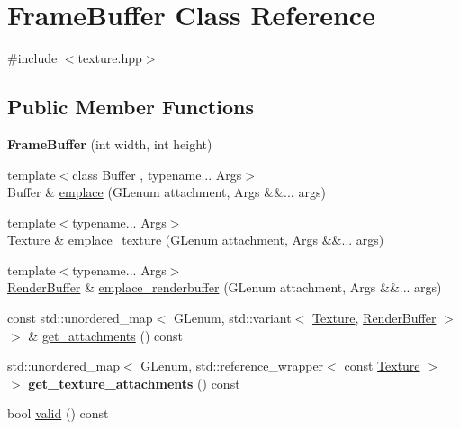 \hypertarget{class_frame_buffer}{}\section{Frame\+Buffer Class Reference}
\label{class_frame_buffer}


{\ttfamily \#include $<$texture.\+hpp$>$}

\subsection*{Public Member Functions}
\begin{DoxyCompactItemize}
\item 
\mbox{\label{class_frame_buffer_aab4c897d360f51c5a96b4782e67e98a9}} 
{\bfseries Frame\+Buffer} (int width, int height)
\item 
{\footnotesize template$<$class Buffer , typename... Args$>$ }\\Buffer \& \mbox{\hyperlink{class_frame_buffer_a291fd980cff8634390c5d6690b70b661}{emplace}} (G\+Lenum attachment, Args \&\&... args)
\item 
{\footnotesize template$<$typename... Args$>$ }\\\mbox{\hyperlink{class_texture}{Texture}} \& \mbox{\hyperlink{class_frame_buffer_a0711e3396075d2d5a2f6fe0185b3d0ab}{emplace\+\_\+texture}} (G\+Lenum attachment, Args \&\&... args)
\item 
{\footnotesize template$<$typename... Args$>$ }\\\mbox{\hyperlink{class_render_buffer}{Render\+Buffer}} \& \mbox{\hyperlink{class_frame_buffer_afa5e09f8734d0692bcec072593faecc9}{emplace\+\_\+renderbuffer}} (G\+Lenum attachment, Args \&\&... args)
\item 
const std\+::unordered\+\_\+map$<$ G\+Lenum, std\+::variant$<$ \mbox{\hyperlink{class_texture}{Texture}}, \mbox{\hyperlink{class_render_buffer}{Render\+Buffer}} $>$ $>$ \& \mbox{\hyperlink{class_frame_buffer_a68f6da84fd228eb6edc786e9e5ea02ad}{get\+\_\+attachments}} () const
\item 
\mbox{\label{class_frame_buffer_a87cf932af3e2f187ae18e146d09dcf28}} 
std\+::unordered\+\_\+map$<$ G\+Lenum, std\+::reference\+\_\+wrapper$<$ const \mbox{\hyperlink{class_texture}{Texture}} $>$ $>$ {\bfseries get\+\_\+texture\+\_\+attachments} () const
\item 
bool \mbox{\hyperlink{class_frame_buffer_a5f86a8082e22b7d7922c8214fd2540a5}{valid}} () const

\end{DoxyCompactItemize}
